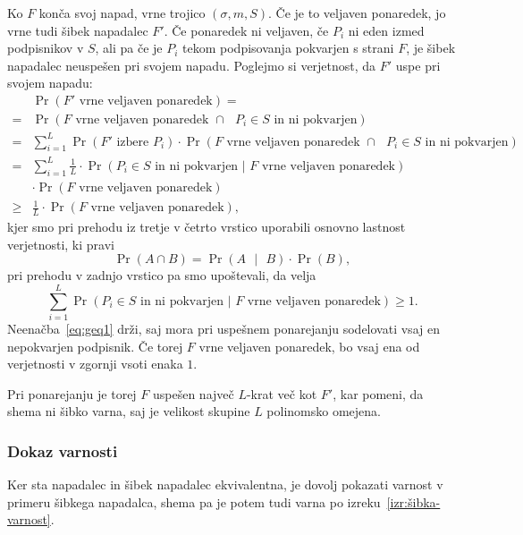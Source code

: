 \begin{dokaz}
    Ko $F$ konča svoj napad, vrne trojico $(\sigma, m, S)$. Če je to veljaven ponaredek, jo vrne tudi
    šibek napadalec $F'$. Če ponaredek ni veljaven, če $P_i$ ni eden izmed podpisnikov v $S$, ali pa
    če je $P_i$ tekom podpisovanja pokvarjen s strani $F$, je šibek napadalec neuspešen pri svojem napadu.
    Poglejmo si verjetnost, da $F'$ uspe pri svojem napadu:
    \begin{align*}
          &\Pr(\text{$F'$ vrne veljaven ponaredek}) = \\
        = &\Pr(\text{$F$ vrne veljaven ponaredek } \cap \text{ $P_i \in S$ in ni pokvarjen}) \\
        = &\sum_{i=1}^L \Pr(\text{$F'$ izbere $P_i$}) \cdot 
            \Pr(\text{$F$ vrne veljaven ponaredek } \cap \text{ $P_i \in S$ in ni pokvarjen}) \\
        = &\sum_{i=1}^L \frac{1}{L} \cdot 
            \Pr(\text{$P_i \in S$ in ni pokvarjen | $F$ vrne veljaven ponaredek}) \\
          &\cdot \Pr(\text{$F$ vrne veljaven ponaredek}) \\
        \geq &\frac{1}{L} \cdot \Pr(\text{$F$ vrne veljaven ponaredek}),
    \end{align*}
    kjer smo pri prehodu iz tretje v četrto vrstico uporabili osnovno lastnost verjetnosti, ki pravi
    $$
    \Pr(A \cap B) = \Pr(A \text{ }|\text{ } B) \cdot \Pr(B),
    $$
    pri prehodu v zadnjo vrstico pa smo upoštevali, da velja
    \begin{equation}
    \label{eq:geq1}
    \sum_{i=1}^L \Pr(\text{$P_i \in S$ in ni pokvarjen | $F$ vrne veljaven ponaredek}) \geq 1.
    \end{equation}
    Neenačba~\eqref{eq:geq1} drži, saj mora pri uspešnem ponarejanju sodelovati vsaj en nepokvarjen
    podpisnik. Če torej $F$ vrne veljaven ponaredek, bo vsaj ena od verjetnosti v zgornji vsoti enaka $1$.

    Pri ponarejanju je torej $F$ uspešen največ $L$-krat več kot $F'$, kar pomeni, da shema ni šibko
    varna, saj je velikost skupine $L$ polinomsko omejena.
\end{dokaz}

\subsubsection{Dokaz varnosti}
Ker sta napadalec in šibek napadalec ekvivalentna, je dovolj pokazati varnost v primeru šibkega
napadalca, shema pa je potem tudi varna po izreku~\ref{izr:šibka-varnost}.

